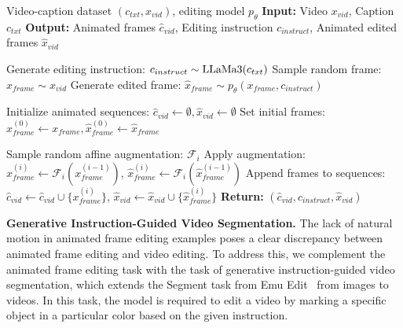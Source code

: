 \begin{algorithm}[H]
    \caption{Animated Frame Editing Dataset Creation}
    \label{alg:augmentation}
    \begin{algorithmic}[1]
        \Require Video-caption dataset $ (c_{txt}, x_{vid}) $, editing model $ p_\theta $
        \State \textbf{Input:} Video $ x_{vid} $, Caption $ c_{txt} $
        \State \textbf{Output:} Animated frames $ \hat{c}_{vid} $, Editing instruction $ c_{instruct} $, Animated edited frames $ \hat{x}_{vid} $

        \State Generate editing instruction: $ c_{instruct} \sim \text{LLaMa3}(c_{txt}) $
        \State Sample random frame: $ x_{frame} \sim x_{vid} $
        \State Generate edited frame: $ \hat{x}_{frame} \sim p_\theta(x_{frame}, c_{instruct}) $

        \State Initialize animated sequences: $ \hat{c}_{vid} \gets \emptyset, \hat{x}_{vid} \gets \emptyset $
        \State Set initial frames: $ x_{frame}^{(0)} \gets x_{frame}, \hat{x}_{frame}^{(0)} \gets \hat{x}_{frame} $

            \State Sample random affine augmentation: \( \mathcal{F}_i \)
            \State Apply augmentation: \( x_{frame}^{(i)} \gets \mathcal{F}_i(x_{frame}^{(i-1)}) \), \( \hat{x}_{frame}^{(i)} \gets \mathcal{F}_i(\hat{x}_{frame}^{(i-1)}) \)
            \State Append frames to sequences: \( \hat{c}_{vid} \gets \hat{c}_{vid} \cup \{x_{frame}^{(i)}\} \), \( \hat{x}_{vid} \gets \hat{x}_{vid} \cup \{\hat{x}_{frame}^{(i)}\} \)
        \EndFor
        \State \textbf{Return:} $ (\hat{c}_{vid}, c_{instruct}, \hat{x}_{vid}) $
    \end{algorithmic}
\end{algorithm}

\textbf{Generative Instruction-Guided Video Segmentation.}
The lack of natural motion in animated frame editing examples poses a clear discrepancy between animated frame editing and video editing.
To address this, we complement the animated frame editing task with the task of generative instruction-guided video segmentation, which extends the Segment task from Emu Edit~\citep{emuedit} from images to videos.
In this task, the model is required to edit a video by marking a specific object in a particular color based on the given instruction.


